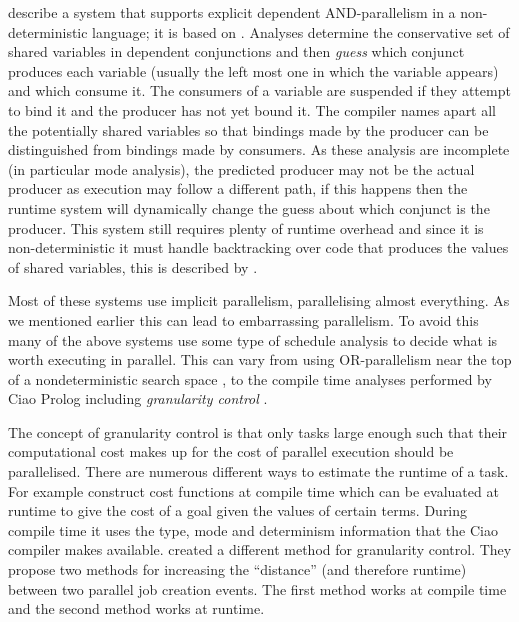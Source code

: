 \citet*{pontelli:1996:ddas} describe a system that supports explicit
dependent AND-parallelism in a non-deterministic language;
it is based on \citet{gupta:1991:ace}.
Analyses determine the conservative set of shared variables in dependent
conjunctions and then \emph{guess} which conjunct produces each variable
(usually the left most one in which the variable appears) and which consume it.
The consumers of a variable are suspended if they attempt to bind it and the
producer has not yet bound it.
The compiler names apart all the potentially shared variables so
that bindings made by the producer can be distinguished
from bindings made by consumers.
As these analysis are incomplete (in particular mode analysis),
the predicted producer may not be the actual producer as execution may
follow a different path,
if this happens then the runtime system will dynamically change the guess
about which conjunct is the producer.
This system still requires plenty of runtime overhead and since it is
non-deterministic it must handle backtracking over code that produces the
values of shared variables,
this is described by \citet{shen:1996:daswam}.

Most of these systems use implicit parallelism, parallelising almost
everything.
As we mentioned earlier this can lead to embarrassing parallelism.
To avoid this many of the above systems use some type of schedule analysis
to decide what is worth executing in parallel.
This can vary from using OR-parallelism near the top of a nondeterministic
search space \citep{hausman:1987:or},
to the compile time analyses performed by Ciao Prolog
\citep{hermenegildo_ciao} including \emph{granularity control}
\citep{lopez96:distance_granularity}.

The concept of granularity control
\citep{debray:1990:granularity} is that only tasks
large enough such that their computational cost makes up for the cost of
parallel execution should be parallelised.
There are numerous different ways to estimate the runtime of a task.
For example \citet*{lopez96:distance_granularity} construct cost functions
at compile time which can be evaluated at runtime to give the cost of a
goal given the values of certain terms.
During compile time it uses the type, mode and determinism information that
the Ciao compiler makes available.
\citet*{shen_98_granularity-control} created a different method for
granularity control.
They propose two methods for increasing the ``distance''
(and therefore runtime)
between two parallel job creation events.
The first method works at compile time and the second method works at
runtime.

